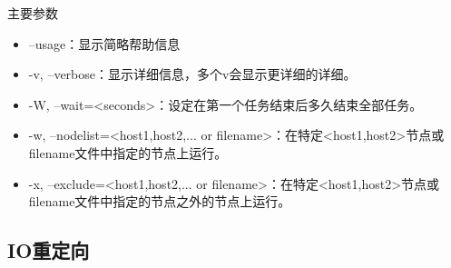 \begin{frame}{主要参数}
\begin{itemize}
\item --usage：显示简略帮助信息
\item -v, --verbose：显示详细信息，多个v会显示更详细的详细。
\item -W, --wait=<seconds>：设定在第一个任务结束后多久结束全部任务。
\item -w, --nodelist=<host1,host2,... or filename>：在特定<host1,host2>节点或filename文件中指定的节点上运行。
\item -x, --exclude=<host1,host2,... or filename>：在特定<host1,host2>节点或filename文件中指定的节点之外的节点上运行。
\end{itemize}
\end{frame}

\subsection{IO重定向}
